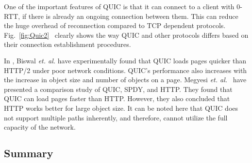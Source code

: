 One of the important features of QUIC is that it can connect to a client with 0-RTT, if there is already an ongoing connection between them. This can reduce the huge overhead of reconnection compared to TCP dependent protocols. Fig.~\ref{fig:Quic2}~\cite{quicisquic} clearly shows the way QUIC and other protocols differs based on their connection establishment procedures. 
%
%

In \cite{quicmakewebfast}, Biswal \textit{et. al.} have experimentally found that QUIC loads pages quicker than HTTP/2 under poor network conditions. QUIC's performance also increases with the increase in object size and number of objects on a page. Megyesi \textit{et. al.}~\cite{quicisquic} have presented a comparison study of QUIC, SPDY, and HTTP. They found that QUIC can load pages faster than HTTP. However, they also concluded that HTTP works better for large object size. It can be noted here that QUIC does not support multiple paths inherently, and therefore, cannot utilize the full capacity of the network. 

\subsection{Summary}

